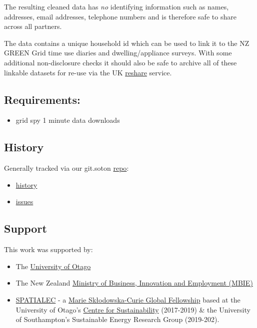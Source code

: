 \documentclass[]{article}
\providecommand{\tightlist}{%
  \setlength{\itemsep}{0pt}\setlength{\parskip}{0pt}}
\begin{document}
The resulting cleaned data has \emph{no} identifying information such as
names, addresses, email addresses, telephone numbers and is therefore
safe to share across all partners.

The data contains a unique household id which can be used to link it to
the NZ GREEN Grid time use diaries and dwelling/appliance surveys. With
some additional non-disclosure checks it should also be safe to archive
all of these linkable datasets for re-use via the UK
\href{http://reshare.ukdataservice.ac.uk/}{reshare} service.

\subsection{Requirements:}\label{requirements}

\begin{itemize}
\tightlist
\item
  grid spy 1 minute data downloads
\end{itemize}

\subsection{History}\label{history}

Generally tracked via our git.soton
\href{https://git.soton.ac.uk/ba1e12/nzGREENGrid}{repo}:

\begin{itemize}
\tightlist
\item
  \href{https://git.soton.ac.uk/ba1e12/nzGREENGrid/commits/master}{history}
\item
  \href{https://git.soton.ac.uk/ba1e12/nzGREENGrid/issues}{issues}
\end{itemize}

\subsection{Support}\label{support}

This work was supported by:

\begin{itemize}
\tightlist
\item
  The \href{https://www.otago.ac.nz/}{University of Otago}
\item
  The New Zealand \href{http://www.mbie.govt.nz/}{Ministry of Business,
  Innovation and Employment (MBIE)}
\item
  \href{http://www.energy.soton.ac.uk/tag/spatialec/}{SPATIALEC} - a
  \href{http://ec.europa.eu/research/mariecurieactions/about-msca/actions/if/index_en.htm}{Marie
  Skłodowska-Curie Global Fellowship} based at the University of Otago's
  \href{http://www.otago.ac.nz/centre-sustainability/staff/otago673896.html}{Centre
  for Sustainability} (2017-2019) \& the University of Southampton's
  Sustainable Energy Research Group (2019-202).
\end{itemize}
\end{document}
